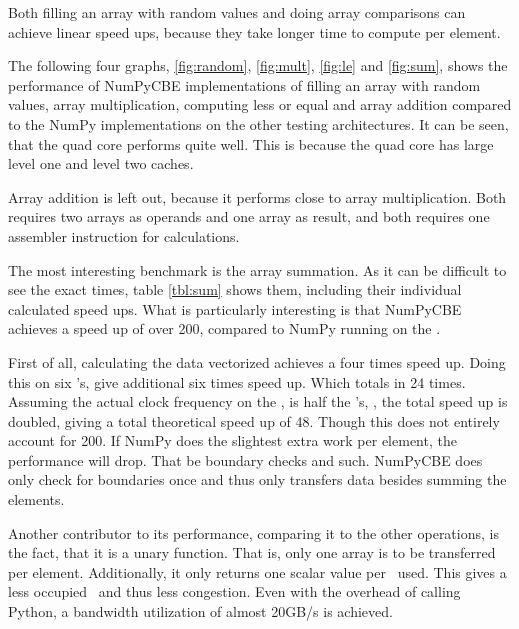 Both filling an array with random values and doing array comparisons
can achieve linear speed ups, because they take longer time to compute
per element. 



The following four
graphs, \ref{fig:random}, \ref{fig:mult}, \ref{fig:le}
and \ref{fig:sum}, shows the performance of NumPyCBE implementations
of filling an array with random values, array multiplication,
computing less or equal and array addition compared to the NumPy
implementations on the other testing architectures. It can be seen,
that the quad core performs quite well. This is because the quad core
has large level one and level two caches.

Array addition is left out, because it performs close to array
multiplication. Both requires two arrays as operands and one array as
result, and both requires one assembler instruction for calculations.

The most interesting benchmark is the array summation. As it can be
difficult to see the exact times, table \ref{tbl:sum} shows them,
including their individual calculated speed ups. What is particularly
interesting is that NumPyCBE achieves a speed up of over 200, compared
to NumPy running on the \PPE{}. 

First of all, calculating the data vectorized achieves a four times
speed up. Doing this on six \SPE{}'s, give additional six times speed
up. Which totals in 24 times. Assuming the actual clock frequency on
the \PPE{}, is half the \SPE{}'s, , the total
speed up is doubled, giving a total theoretical speed up of 48. Though
this does not entirely account for 200. If NumPy does the slightest
extra work per element, the performance will drop. That be boundary
checks and such. NumPyCBE does only check for boundaries once and thus
only transfers data besides summing the elements.

Another contributor to its performance, comparing it to the other
operations, is the fact, that it is a unary function. That is, only
one array is to be transferred per element. Additionally, it only
returns one scalar value per \SPE\ used. This gives a less
occupied \EIB\ and thus less congestion. Even with the overhead of
calling Python, a bandwidth utilization of almost 20GB/s is achieved.


